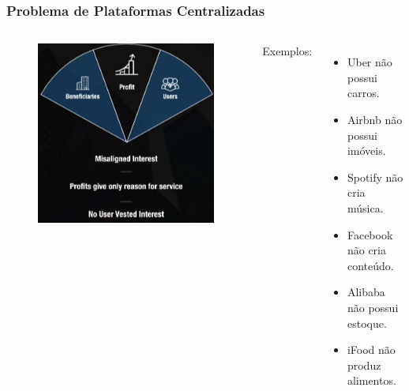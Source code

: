 \documentclass[11pt, red]{beamer}
\begin{document}
\begin{frame}
    \frametitle{Problema de Plataformas Centralizadas}
    \begin{beamerboxesrounded}[lower=fundocinza,shadow=true]{}
        \begin{columns}
        \scriptsize
        \begin{figure}[htb]
            \begin{center}
                \includegraphics[width=0.9\linewidth]{fig/mitm.png}
            \end{center}
        \end{figure}
            Exemplos:
            \begin{itemize}
                \item Uber n\~ao possui carros.
                \item Airbnb n\~ao possui im\'oveis.
                \item Spotify n\~ao cria m\'usica.
                \item Facebook n\~ao cria conte\'udo.
                \item Alibaba n\~ao possui estoque.
                \item iFood n\~ao produz alimentos.
            \end{itemize}
        \end{columns}
    \end{beamerboxesrounded}
\end{frame}
\end{document}
